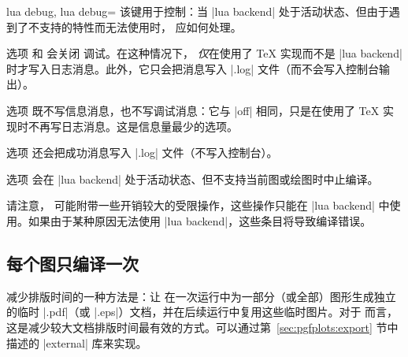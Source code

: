 {\begin{pgfplotskeylist}{%
    lua debug,
    lua debug=%
}
    该键用于控制：当 |lua backend| 处于活动状态、但由于遇到了不支持的特性而无法使用时，\PGFPlots{} 应如何处理。

    选项  和  会关闭 \lua{} 调试。在这种情况下，\PGFPlots{} \emph{仅}在使用了 \TeX{} 实现而不是 |lua backend| 时才写入日志消息。此外，它只会把消息写入 |.log| 文件（而不会写入控制台输出）。

    选项  既不写信息消息，也不写调试消息：它与 |off| 相同，只是在使用了 \TeX{} 实现时不再写日志消息。这是信息量最少的选项。

    选项  还会把成功消息写入 |.log| 文件（不写入控制台）。

    选项  会在 |lua backend| 处于活动状态、但不支持当前图或绘图时中止编译。

    请注意，\PGFPlots{} 可能附带一些开销较大的受限操作，这些操作只能在 |lua backend| 中使用。如果由于某种原因无法使用 |lua backend|，这些条目将导致编译错误。
\end{pgfplotskeylist}


\subsection{每个图只编译一次}

减少排版时间的一种方法是：让 \PGF{} 在一次运行中为一部分（或全部）图形生成独立的临时 |.pdf|（或 |.eps|）文档，并在后续运行中复用这些临时图片。对于 \PGFPlots{} 而言，这是减少较大文档排版时间最有效的方式。可以通过第~\ref{sec:pgfplots:export} 节中描述的 |external| 库来实现。

}
